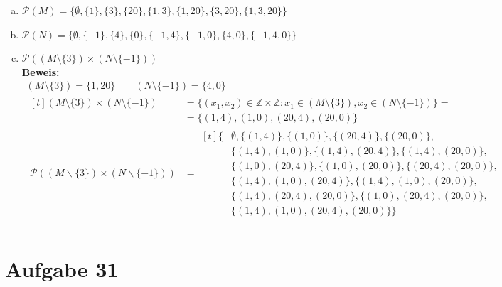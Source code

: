 \documentclass[10pt, oneside]{article}
\begin{document}
\begin{enumerate}[(a)]
    \item $\mathcal{P}(M) = \{\emptyset, \{1\}, \{3\}, \{20\}, \{1, 3\},
                              \{1, 20\}, \{3, 20\}, \{1, 3, 20\}\}$
    \item $\mathcal{P}(N) = \{\emptyset, \{-1\}, \{4\}, \{0\}, \{-1, 4\},
                              \{-1, 0\}, \{4, 0\}, \{-1, 4, 0\}\}$
    \item $\mathcal{P}((M \setminus \{3\}) \times (N \setminus \{-1\}))$ \\[5pt]
        \textbf{Beweis:}
        \begin{equation*}
            \begin{gathered}
                (M \setminus \{3\}) = \{1, 20\} \quad\quad (N \setminus \{-1\}) = \{4, 0\} \\[5pt]
                \begin{aligned}[t]
                    (M \setminus \{3\}) \times (N \setminus \{-1\}) &= \{(x_1,
                    x_2) \in \mathbb{Z} \times \mathbb{Z} : x_1 \in (M
                    \setminus \{3\}), x_2 \in (N \setminus \{-1\})\} = \\[5pt]
                    &= \{(1, 4), (1, 0), (20, 4), (20, 0)\} \\[5pt]
                    \mathcal{P}((M \backslash\{3\}) \times(N \backslash\{-1\})) &=
                    \begin{aligned}[t]
                        \{&\emptyset,\{(1,4)\},\{(1,0)\},\{(20,4)\},\{(20,0)\},\\
                          &\{(1,4),(1,0)\},\{(1,4),(20,4)\}, \{(1,4),(20,0)\}, \\
                          &\{(1,0),(20,4)\},\{(1,0),(20,0)\},\{(20,4),(20,0)\}, \\
                          &\{(1,4),(1,0),(20,4)\},\{(1,4),(1,0),(20,0)\}, \\
                          &\{(1,4),(20,4),(20,0)\},\{(1,0),(20,4),(20,0)\}, \\
                          &\{(1,4),(1,0),(20,4),(20,0)\}\}
                    \end{aligned}
                \end{aligned} \\[5pt]
            \end{gathered}
        \end{equation*}
\end{enumerate}

\section{Aufgabe 31}
\end{document}
